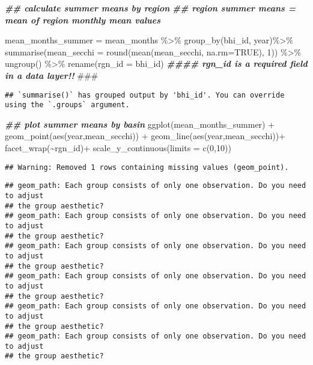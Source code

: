 \documentclass[
]{article}
\newenvironment{Shaded}{\begin{snugshade}}{\end{snugshade}}
\newcommand{\AlertTok}[1]{\textcolor[rgb]{0.94,0.16,0.16}{#1}}
\newcommand{\AttributeTok}[1]{\textcolor[rgb]{0.77,0.63,0.00}{#1}}
\newcommand{\ConstantTok}[1]{\textcolor[rgb]{0.00,0.00,0.00}{#1}}
\newcommand{\DecValTok}[1]{\textcolor[rgb]{0.00,0.00,0.81}{#1}}
\newcommand{\DocumentationTok}[1]{\textcolor[rgb]{0.56,0.35,0.01}{\textbf{\textit{#1}}}}
\newcommand{\FunctionTok}[1]{\textcolor[rgb]{0.00,0.00,0.00}{#1}}
\newcommand{\NormalTok}[1]{#1}
\newcommand{\OtherTok}[1]{\textcolor[rgb]{0.56,0.35,0.01}{#1}}
\newcommand{\SpecialCharTok}[1]{\textcolor[rgb]{0.00,0.00,0.00}{#1}}
\begin{document}
\begin{Shaded}
\begin{Highlighting}[]
\DocumentationTok{\#\# calculate summer means by region}
\DocumentationTok{\#\# region summer means = mean of region monthly mean values}

\NormalTok{mean\_months\_summer }\OtherTok{=}\NormalTok{ mean\_months }\SpecialCharTok{\%\textgreater{}\%} 
                      \FunctionTok{group\_by}\NormalTok{(bhi\_id, year)}\SpecialCharTok{\%\textgreater{}\%}
                      \FunctionTok{summarise}\NormalTok{(}\AttributeTok{mean\_secchi =} \FunctionTok{round}\NormalTok{(}\FunctionTok{mean}\NormalTok{(mean\_secchi, }\AttributeTok{na.rm=}\ConstantTok{TRUE}\NormalTok{), }\DecValTok{1}\NormalTok{)) }\SpecialCharTok{\%\textgreater{}\%}
                      \FunctionTok{ungroup}\NormalTok{()  }\SpecialCharTok{\%\textgreater{}\%} 
  \FunctionTok{rename}\NormalTok{(}\AttributeTok{rgn\_id =}\NormalTok{ bhi\_id) }\DocumentationTok{\#\#\#\# rgn\_id is a required field in a data layer!! }\AlertTok{\#\#\#}
\end{Highlighting}
\end{Shaded}

\begin{verbatim}
## `summarise()` has grouped output by 'bhi_id'. You can override using the `.groups` argument.
\end{verbatim}

\begin{Shaded}
\begin{Highlighting}[]
\DocumentationTok{\#\# plot summer means by basin}
\FunctionTok{ggplot}\NormalTok{(mean\_months\_summer) }\SpecialCharTok{+} 
  \FunctionTok{geom\_point}\NormalTok{(}\FunctionTok{aes}\NormalTok{(year,mean\_secchi)) }\SpecialCharTok{+}
  \FunctionTok{geom\_line}\NormalTok{(}\FunctionTok{aes}\NormalTok{(year,mean\_secchi))}\SpecialCharTok{+}
  \FunctionTok{facet\_wrap}\NormalTok{(}\SpecialCharTok{\textasciitilde{}}\NormalTok{rgn\_id)}\SpecialCharTok{+}
  \FunctionTok{scale\_y\_continuous}\NormalTok{(}\AttributeTok{limits =} \FunctionTok{c}\NormalTok{(}\DecValTok{0}\NormalTok{,}\DecValTok{10}\NormalTok{))}
\end{Highlighting}
\end{Shaded}

\begin{verbatim}
## Warning: Removed 1 rows containing missing values (geom_point).
\end{verbatim}

\begin{verbatim}
## geom_path: Each group consists of only one observation. Do you need to adjust
## the group aesthetic?
## geom_path: Each group consists of only one observation. Do you need to adjust
## the group aesthetic?
## geom_path: Each group consists of only one observation. Do you need to adjust
## the group aesthetic?
## geom_path: Each group consists of only one observation. Do you need to adjust
## the group aesthetic?
## geom_path: Each group consists of only one observation. Do you need to adjust
## the group aesthetic?
## geom_path: Each group consists of only one observation. Do you need to adjust
## the group aesthetic?
\end{verbatim}
\end{document}
